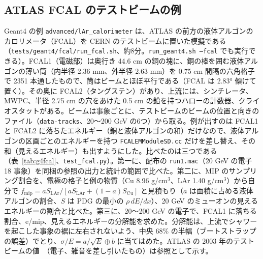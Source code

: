 \documentclass[a4paper,10pt]{ltjsarticle}
\begin{document}
\subsection{ATLAS FCAL のテストビームの例}\label{sec:geant4fcal}

Geant4 の例 \texttt{advanced/lAr\_calorimeter} は、ATLAS の前方の液体アルゴンのカロリメータ（FCAL）を CERN のテストビームに置いた模擬である（\nolinkurl{tests/geant4/fcal/run_fcal.sh}、約8分。\texttt{run\_geant4.sh --fcal} でも実行できる）。FCAL1（電磁部）は奥行き 44.6 cm の銅の塊に、銅の棒を囲む液体アルゴンの薄い筒（内半径 2.36 mm、外半径 2.63 mm）を 0.75 cm 間隔の六角格子で 2351 本通したもので、筒はビームとほぼ平行である（FCAL は 2.83° 傾けて置く）。その奥に FCAL2（タングステン）があり、上流には、シンチレータ、MWPC、半径 2.75 cm の穴をあけた 0.5 cm の鉛を持つハローの計数器、クライオスタットがある。ビームは事象ごとに、テストビームのビームの位置と向きのファイル（\texttt{data-tracks}、20〜200 GeV の6つ）から取る。例が出すのは FCAL1 と FCAL2 に落ちたエネルギー（銅と液体アルゴンの和）だけなので、液体アルゴンの区画ごとのエネルギーを持つ \texttt{FCALEMModuleSD.cc} だけを差し替え、その和（見えるエネルギー）も出すようにした。比べたのは三つである（表~\ref{tab:g4fcal}、\texttt{test\_fcal.py}）。第一に、配布の \texttt{run1.mac}（20 GeV の電子 18 事象）を同梱の参照の出力と統計の範囲で比べた。第二に、MIP のサンプリング割合を、電極の格子と例の物質（Cu 8.96 g/cm$^3$、LAr 1.40 g/cm$^3$）から自分で $f_{\mathrm{mip}}=aS_{\mathrm{LAr}}/[aS_{\mathrm{LAr}}+(1-a)S_{\mathrm{Cu}}]$ と見積もり（$a$ は面積に占める液体アルゴンの割合、$S$ は PDG の最小の $\rho\,dE/dx$）、20 GeV のミューオンの見えるエネルギーの割合と比べた。第三に、20〜200 GeV の電子で、FCAL1 に落ちる割合、e/mip、見えるエネルギーの分解能を求めた。分解能は、上流でシャワーを起こした事象の裾に左右されないよう、中央 68\% の半幅（ブートストラップの誤差）でとり、$\sigma/E=a/\sqrt E\oplus b$ に当てはめた。ATLAS の 2003 年のテストビームの値~\cite{fcaltb}（電子、雑音を差し引いたもの）は参照として示す。
\end{document}
